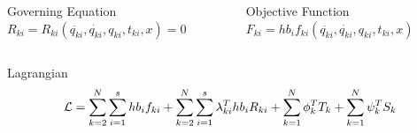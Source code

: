 \documentclass{beamer}
\begin{document}
\begin{frame}[allowframebreaks]
\begin{columns}[T]
\begin{column}{.48\textwidth}
\begin{block}{Governing Equation}
        $R_{ki} = R_{ki}(\ddot{q_{ki}},\dot{q_{ki}},q_{ki},t_{ki}, x)=0$
      \end{block}
    \end{column}%
    \hfill
    \begin{column}{.58\textwidth}
      \begin{block}{Objective Function}\centering
        $F_{ki} =  h b_i f_{ki}(\ddot{q_{ki}},\dot{q_{ki}},q_{ki},t_{ki}, x)$
      \end{block}
    \end{column}%
  \end{columns}
  \medskip
  \begin{columns}[T] %
    \begin{column}{1.0\textwidth}
      \begin{block}{Lagrangian}\vspace{-0.75cm}\centering
        \[ {\cal{L}} = \sum_{k=2}^{N} \sum_{i=1}^s h b_i f_{ki}  +  \sum_{k=2}^{N} \sum_{i=1}^s\lambda_{ki}^T  h b_i R_{ki}  + \sum_{k=1}^N \phi_k^T T_k + \sum_{k=1}^N \psi_k^T S_k \]
      \end{block}
    \end{column}%
  \end{columns}
\end{frame}
\end{document}
